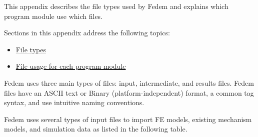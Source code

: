 %
%

%
%

\def\Ext#1{\File{.#1}}


This appendix describes the file types used by Fedem
and explains which program module use which files.

Sections in this appendix address the following topics:

\begin{itemize}
\item
  \protect\hyperlink{file-types}{File types}
\item
  \protect\hyperlink{file-usage-for-each-program-module}
                    {File usage for each program module}
\end{itemize}

\clearpage



Fedem uses three main types of files: input, intermediate, and results files.
Fedem files have an ASCII text or Binary (platform-independent) format,
a common tag syntax, and use intuitive naming conventions.



Fedem uses several types of input files to import FE models,
existing mechanism models, and simulation data as listed in the following table.

